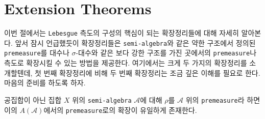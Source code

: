 \section{Extension Theorems}

이번 절에서는 \texttt{Lebesgue} 측도의 구성의 핵심이 되는 확장정리들에 대해 자세히 알아본다. 앞서 잠시 언급했듯이 확장정리들은 \texttt{semi-algebra}와 같은 약한 구조에서 정의된 \texttt{premeasure}를 대수나 $\sigma$-대수와 같은 보다 강한 구조를 가진 곳에서의 \texttt{premeasure}나 측도로 확장시킬 수 있는 방법을 제공한다. 여기에서는 크게 두 가지의 확장정리를 소개할텐데, 첫 번째 확장정리에 비해 두 번째 확장정리는 조금 깊은 이해를 필요로 한다. 마음의 준비를 하도록 하자.

\begin{theorem}\label{thm:semiAlgebraExtension}
    공집합이 아닌 집합 $X$ 위의 \texttt{semi-algebra} $\mathcal{A}$에 대해 $\rho$를 $\mathcal{A}$ 위의 \texttt{premeasure}라 하면 이의 $A(\mathcal{A})$에서의 \texttt{premeasure}로의 확장이 유일하게 존재한다.
\end{theorem}


